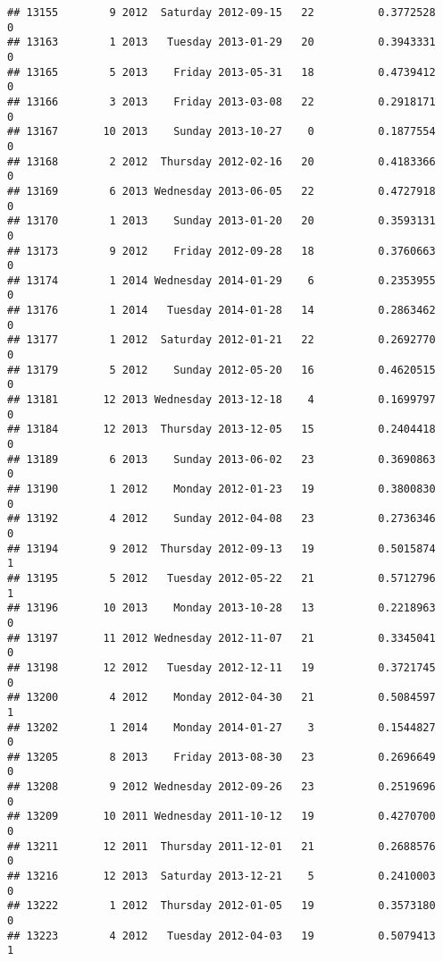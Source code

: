 \documentclass[
]{article}
\begin{document}
\begin{verbatim}
## 13155        9 2012  Saturday 2012-09-15   22          0.3772528             0
## 13163        1 2013   Tuesday 2013-01-29   20          0.3943331             0
## 13165        5 2013    Friday 2013-05-31   18          0.4739412             0
## 13166        3 2013    Friday 2013-03-08   22          0.2918171             0
## 13167       10 2013    Sunday 2013-10-27    0          0.1877554             0
## 13168        2 2012  Thursday 2012-02-16   20          0.4183366             0
## 13169        6 2013 Wednesday 2013-06-05   22          0.4727918             0
## 13170        1 2013    Sunday 2013-01-20   20          0.3593131             0
## 13173        9 2012    Friday 2012-09-28   18          0.3760663             0
## 13174        1 2014 Wednesday 2014-01-29    6          0.2353955             0
## 13176        1 2014   Tuesday 2014-01-28   14          0.2863462             0
## 13177        1 2012  Saturday 2012-01-21   22          0.2692770             0
## 13179        5 2012    Sunday 2012-05-20   16          0.4620515             0
## 13181       12 2013 Wednesday 2013-12-18    4          0.1699797             0
## 13184       12 2013  Thursday 2013-12-05   15          0.2404418             0
## 13189        6 2013    Sunday 2013-06-02   23          0.3690863             0
## 13190        1 2012    Monday 2012-01-23   19          0.3800830             0
## 13192        4 2012    Sunday 2012-04-08   23          0.2736346             0
## 13194        9 2012  Thursday 2012-09-13   19          0.5015874             1
## 13195        5 2012   Tuesday 2012-05-22   21          0.5712796             1
## 13196       10 2013    Monday 2013-10-28   13          0.2218963             0
## 13197       11 2012 Wednesday 2012-11-07   21          0.3345041             0
## 13198       12 2012   Tuesday 2012-12-11   19          0.3721745             0
## 13200        4 2012    Monday 2012-04-30   21          0.5084597             1
## 13202        1 2014    Monday 2014-01-27    3          0.1544827             0
## 13205        8 2013    Friday 2013-08-30   23          0.2696649             0
## 13208        9 2012 Wednesday 2012-09-26   23          0.2519696             0
## 13209       10 2011 Wednesday 2011-10-12   19          0.4270700             0
## 13211       12 2011  Thursday 2011-12-01   21          0.2688576             0
## 13216       12 2013  Saturday 2013-12-21    5          0.2410003             0
## 13222        1 2012  Thursday 2012-01-05   19          0.3573180             0
## 13223        4 2012   Tuesday 2012-04-03   19          0.5079413             1

\end{verbatim}
\end{document}
